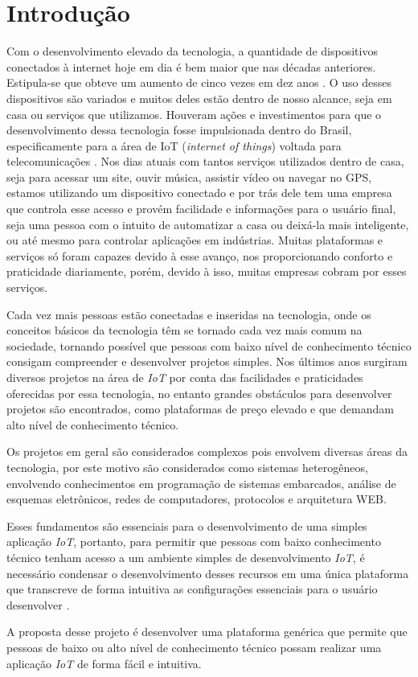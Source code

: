 \documentclass[../../layout.tex]{subfiles}
\begin{document}
\chapter{Introdução}
Com o desenvolvimento elevado da tecnologia, a quantidade de dispositivos conectados à internet hoje em dia é bem maior que nas décadas anteriores. Estipula-se que obteve um aumento de cinco vezes em dez anos \cite{conectdevicesnum}. O uso desses dispositivos são variados e muitos deles estão dentro de nosso alcance, seja em casa ou serviços que utilizamos. Houveram ações e investimentos para que o desenvolvimento dessa tecnologia fosse impulsionada dentro do Brasil, especificamente para a área de IoT (\emph{internet of things}) voltada para telecomunicações \cite{iotinvest}. Nos dias atuais com tantos serviços utilizados dentro de casa, seja para acessar um site, ouvir música, assistir vídeo ou navegar no GPS, estamos utilizando um dispositivo conectado e por trás dele tem uma empresa que controla esse acesso e provém facilidade e informações para o usuário final, seja uma pessoa com o intuito de automatizar a casa ou deixá-la mais inteligente, ou até mesmo para controlar aplicações em indústrias. Muitas plataformas e serviços só foram capazes devido à esse avanço, nos proporcionando conforto e praticidade diariamente, porém, devido à isso, muitas empresas cobram por esses serviços.\par
Cada vez mais pessoas estão conectadas e inseridas na tecnologia, onde os conceitos básicos da tecnologia têm se tornado cada vez mais comum na sociedade, tornando possível que pessoas com baixo nível de conhecimento técnico consigam compreender e desenvolver projetos simples. Nos últimos anos surgiram diversos projetos na área de \emph{IoT} por conta das facilidades e praticidades oferecidas por essa tecnologia, no entanto grandes obstáculos para desenvolver projetos são encontrados, como plataformas de preço elevado e que demandam alto nível de conhecimento técnico.\par
Os projetos em geral são considerados complexos pois envolvem diversas áreas da tecnologia, por este motivo são considerados como sistemas heterogêneos, envolvendo conhecimentos em programação de sistemas embarcados, análise de esquemas eletrônicos, redes de computadores, protocolos e arquitetura WEB.\par
Esses fundamentos são essenciais para o desenvolvimento de uma simples aplicação \emph{IoT}, portanto, para permitir que pessoas com baixo conhecimento técnico tenham acesso a um ambiente simples de desenvolvimento \emph{IoT}, é necessário condensar o desenvolvimento desses recursos em uma única plataforma que transcreve de forma intuitiva as configurações essenciais para o usuário desenvolver \cite{IoTeveryone}.\par
A proposta desse projeto é desenvolver uma plataforma genérica que permite que pessoas de baixo ou alto nível de conhecimento técnico possam realizar uma aplicação \emph{IoT} de forma fácil e intuitiva.
\end{document}
